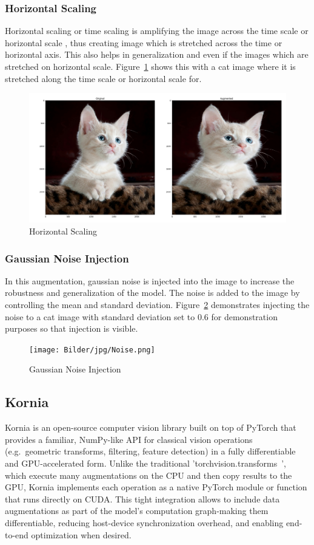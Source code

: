 \subsubsection{Horizontal Scaling}
Horizontal scaling or time scaling is amplifying the image across the time scale or horizontal scale , thus creating image which is stretched across the time or horizontal axis. This also helps in generalization and even if the images which are stretched on horizontal scale. Figure~\ref{time} shows this with a cat image where it is stretched along the time scale or horizontal scale for. 

\begin{figure}[h]
    \centering
    \includegraphics[width=0.6\linewidth]{Bilder/jpg/affine.png}
    \caption{Horizontal Scaling~\cite{kitten}}
    \label{time}
\end{figure}

\subsubsection{Gaussian Noise Injection}
In this augmentation, gaussian noise is injected into the image to increase the robustness and generalization of the model. The noise is added to the image by controlling the mean and standard deviation. Figure~\ref{noise} demonstrates injecting the noise to a cat image with standard deviation set to 0.6 for demonstration purposes so that injection is visible.

\begin{figure}[h]
  \centering
  \texttt{[image: Bilder/jpg/Noise.png]}
  \caption{Gaussian Noise Injection~\cite{kitten}}
  \label{noise}
\end{figure}

\subsection{Kornia}

Kornia is an open-source computer vision library built on top of PyTorch that provides a familiar, NumPy-like API for classical vision operations (e.g.\ geometric transforms, filtering, feature detection) in a fully differentiable and GPU-accelerated form. Unlike the traditional 'torchvision.transforms~\cite{torchvision2024}', which execute many augmentations on the CPU and then copy results to the GPU, Kornia implements each operation as a native PyTorch module or function that runs directly on CUDA. This tight integration allows to include data augmentations as part of the model's computation graph-making them differentiable, reducing host-device synchronization overhead, and enabling end-to-end optimization when desired.

